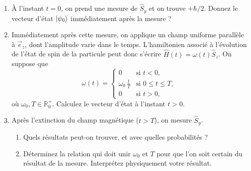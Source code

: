 \begin{enumerate}
\item À l'instant $t=0$, on prend une mesure de $\hat S_y$ et on trouve $+\hbar/2$. Donnez le vecteur d'état $\ket{\psi_0}$ immédiatement après la mesure ? 
\item Immédiatement après cette mesure, on applique un champ uniforme parallèle à $\vec e_z$, dont l'amplitude varie dans le temps. L'hamiltonien associé à l'évolution de l'état de spin de la particule peut donc s'écrire $\hat H (t) = \omega (t) \hat S_z$. On suppose que 
\begin{equation}
\omega (t) = \left\lbrace
\begin{array}{cl}
0 & \text{si } t < 0, \\ 
\omega_0 \, \frac{t}{T} & \text{si } 0 \leq t \leq T, \\ 
0 & \text{si } t > 0,
\end{array} 
\right.
\end{equation}
où $\omega_0,T\in \mathbb{R}^+_0$. Calculez le vecteur d'état à l'instant $t>0$. 
\item Après l'extinction du champ magnétique ($t>T$), on mesure $\hat S_y$. 
\begin{enumerate}
\item Quels résultats peut-on trouver, et avec quelles probabilités ?
\item Déterminez la relation qui doit unir $\omega_0$ et $T$ pour que l'on soit certain du résultat de la mesure. Interprétez physiquement votre résultat.
\end{enumerate}

\end{enumerate}

